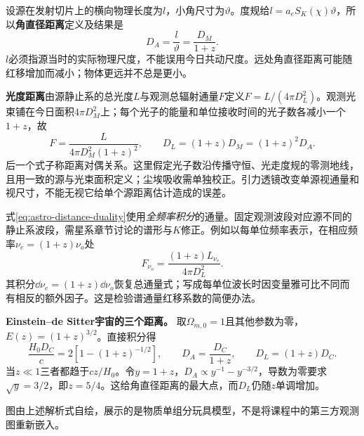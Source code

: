 设源在发射切片上的横向物理长度为$l$，小角尺寸为$\vartheta$。度规给$l=a_eS_K(\chi)\vartheta$，所以\textbf{角直径距离}定义及结果是
\[
 D_A=\frac l\vartheta=\frac{D_M}{1+z}.
\]
$l$必须指源当时的实际物理尺度，不能误用今日共动尺度。远处角直径距离可能随红移增加而减小；物体更远并不总是更小。

\textbf{光度距离}由源静止系的总光度$L$与观测总辐射通量$F$定义$F=L/(4\pi D_L^2)$。观测光束铺在今日面积$4\pi D_M^2$上；每个光子的能量和单位接收时间的光子数各减小一个$1+z$，故
\begin{equation}\label{eq:astro-distance-duality}
 F=\frac{L}{4\pi D_M^2(1+z)^2},\qquad
 D_L=(1+z)D_M=(1+z)^2D_A.
\end{equation}
后一个式子称距离对偶关系。这里假定光子数沿传播守恒、光走度规的零测地线，且用一致的源与光束面积定义；尘埃吸收需单独校正。引力透镜改变单源视通量和视尺寸，不能无视它给单个源距离估计造成的误差。

式\eqref{eq:astro-distance-duality}使用\emph{全频率积分}的通量。固定观测波段对应源不同的静止系波段，需星系章节讨论的谱形与$K$修正。例如以每单位频率表示，在相应频率$\nu_e=(1+z)\nu_o$处
\[
 F_{\nu_o}=\frac{(1+z)L_{\nu_e}}{4\pi D_L^2}.
\]
其积分$\dd\nu_e=(1+z)\dd\nu_o$恢复总通量式；写成每单位波长时因变量雅可比不同而有相反的额外因子。这是检验谱通量红移系数的简便办法。

\begin{example}
\textbf{Einstein--de Sitter宇宙的三个距离。}
取$\Omega_{m,0}=1$且其他参数为零，$E(z)=(1+z)^{3/2}$。直接积分得
\[
 \frac{H_0D_C}{c}=2\left[1-(1+z)^{-1/2}\right],\qquad
 D_A=\frac{D_C}{1+z},\qquad D_L=(1+z)D_C.
\]
当$z\ll1$三者都趋于$cz/H_0$。令$y=1+z$，$D_A\propto y^{-1}-y^{-3/2}$，导数为零要求$\sqrt y=3/2$，即$z=5/4$。这给角直径距离的最大点，而$D_L$仍随$z$单调增加。
\end{example}
\begin{center}
\end{center}
图由上述解析式自绘，展示的是物质单组分玩具模型，不是将课程中的第三方观测图重新嵌入。


